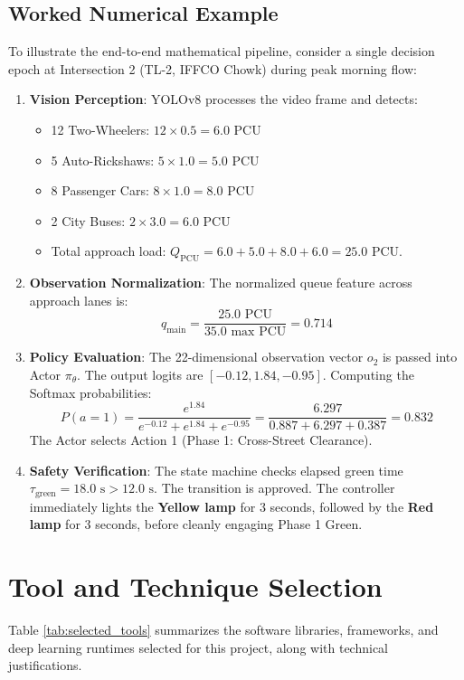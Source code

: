 \documentclass[12pt,a4paper,oneside]{report}
\begin{document}
\subsection{Worked Numerical Example}
To illustrate the end-to-end mathematical pipeline, consider a single decision epoch at Intersection 2 (TL-2, IFFCO Chowk) during peak morning flow:
\begin{enumerate}
    \item \textbf{Vision Perception}: YOLOv8 processes the video frame and detects:
    \begin{itemize}
        \item 12 Two-Wheelers: $12 \times 0.5 = 6.0$ PCU
        \item 5 Auto-Rickshaws: $5 \times 1.0 = 5.0$ PCU
        \item 8 Passenger Cars: $8 \times 1.0 = 8.0$ PCU
        \item 2 City Buses: $2 \times 3.0 = 6.0$ PCU
        \item Total approach load: $Q_{\text{PCU}} = 6.0 + 5.0 + 8.0 + 6.0 = 25.0$ PCU.
    \end{itemize}
    \item \textbf{Observation Normalization}: The normalized queue feature across approach lanes is:
    \begin{equation}
    q_{\text{main}} = \frac{25.0 \text{ PCU}}{35.0 \text{ max PCU}} = 0.714
    \end{equation}
    \item \textbf{Policy Evaluation}: The 22-dimensional observation vector $o_2$ is passed into Actor $\pi_\theta$. The output logits are $[-0.12, 1.84, -0.95]$. Computing the Softmax probabilities:
    \begin{equation}
    P(a = 1) = \frac{e^{1.84}}{e^{-0.12} + e^{1.84} + e^{-0.95}} = \frac{6.297}{0.887 + 6.297 + 0.387} = 0.832
    \end{equation}
    The Actor selects Action 1 (Phase 1: Cross-Street Clearance).
    \item \textbf{Safety Verification}: The state machine checks elapsed green time $\tau_{\text{green}} = 18.0\text{ s} > 12.0\text{ s}$. The transition is approved. The controller immediately lights the \textbf{Yellow lamp} for 3 seconds, followed by the \textbf{Red lamp} for 3 seconds, before cleanly engaging Phase 1 Green.
\end{enumerate}

\section{Tool and Technique Selection}
\label{sec:tool_selection}
Table \ref{tab:selected_tools} summarizes the software libraries, frameworks, and deep learning runtimes selected for this project, along with technical justifications.
\end{document}
